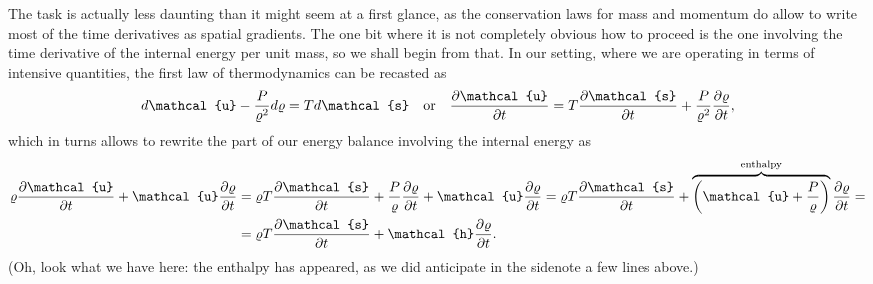 The task is actually less daunting than it might seem at a first glance, as the
conservation laws for mass and momentum do allow to write most of the time derivatives
as spatial gradients. The one bit where it is not completely obvious how to proceed
is the one involving the time derivative of the internal energy per unit mass, so we
shall begin from that. In our setting, where we are operating in terms of intensive
quantities,
the first law of thermodynamics can be recasted as
\begin{align*}
  d\mathcal{u} - \frac{\pressure}{\density^2}d\density = T d\mathcal{s}
  \quad\text{or}\quad
  \pdv{\mathcal{u}}{t} =
  T \pdv{\mathcal{s}}{t} + \frac{\pressure}{\density^2}\pdv{\density}{t},
\end{align*}
which in turns allows to rewrite the part of our energy balance involving the
internal energy as
\begin{align*}
  \density \pdv{\mathcal{u}}{t} + \mathcal{u} \pdv{\density}{t} &=
  \density T \pdv{\mathcal{s}}{t} + \frac{\pressure}{\density}\pdv{\density}{t} +
  \mathcal{u} \pdv{\density}{t} =
  \density T \pdv{\mathcal{s}}{t} +
  \overbrace{\left( \mathcal{u} + \frac{\pressure}{\density} \right)}^{\text{enthalpy}}
  \pdv{\density}{t} =\\
  & = \density T \pdv{\mathcal{s}}{t} + \mathcal{h} \pdv{\density}{t}.
\end{align*}
(Oh, look what we have here: the enthalpy has appeared, as we did anticipate in
the sidenote a few lines above.)

